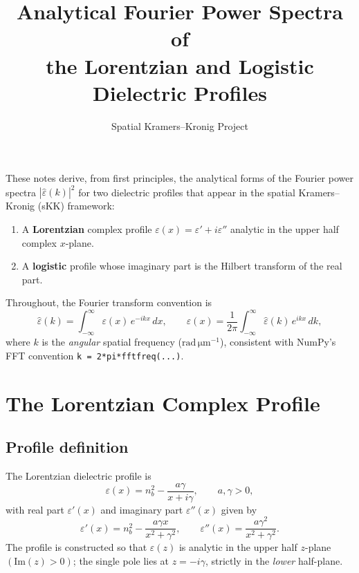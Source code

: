 \documentclass[11pt]{article}
\title{Analytical Fourier Power Spectra of\\
       the Lorentzian and Logistic Dielectric Profiles}
\author{Spatial Kramers--Kronig Project}
\date{}
\newcommand{\gam}{\gamma}
\newcommand{\eps}{\varepsilon}
\newcommand{\epsh}{\hat{\varepsilon}}
\begin{document}
\maketitle
\tableofcontents
\bigskip

\noindent
These notes derive, from first principles, the analytical forms of the Fourier
power spectra $|\epsh(k)|^2$ for two dielectric profiles that appear in the
spatial Kramers--Kronig (sKK) framework:

\begin{enumerate}
    \item A \textbf{Lorentzian} complex profile $\eps(x) = \eps' + i\eps''$
          analytic in the upper half complex $x$-plane.
    \item A \textbf{logistic} profile whose imaginary part is the Hilbert
          transform of the real part.
\end{enumerate}

\noindent
Throughout, the Fourier transform convention is
\begin{equation}\label{eq:ft_convention}
    \epsh(k) = \int_{-\infty}^{\infty} \eps(x)\, e^{-ikx}\, dx,
    \qquad
    \eps(x) = \frac{1}{2\pi}\int_{-\infty}^{\infty} \epsh(k)\, e^{ikx}\, dk,
\end{equation}
where $k$ is the \emph{angular} spatial frequency ($\mathrm{rad\,\mu m^{-1}}$),
consistent with NumPy's FFT convention \texttt{k = 2*pi*fftfreq(...)}.

\section{The Lorentzian Complex Profile}

\subsection{Profile definition}

The Lorentzian dielectric profile is
\begin{equation}\label{eq:lor_profile}
    \eps(x) = n_b^2 - \frac{a\gam}{x + i\gam},
    \qquad a,\gam > 0,
\end{equation}
with real part $\eps'(x)$ and imaginary part $\eps''(x)$ given by
\begin{equation}
    \eps'(x)  = n_b^2 - \frac{a\gam x}{x^2+\gam^2},
    \qquad
    \eps''(x) = \frac{a\gam^2}{x^2+\gam^2}.
\end{equation}
The profile is constructed so that $\eps(z)$ is analytic in the upper
half $z$-plane $(\mathrm{Im}(z)>0)$; the single pole lies at
$z = -i\gam$, strictly in the \emph{lower} half-plane.
\end{document}
